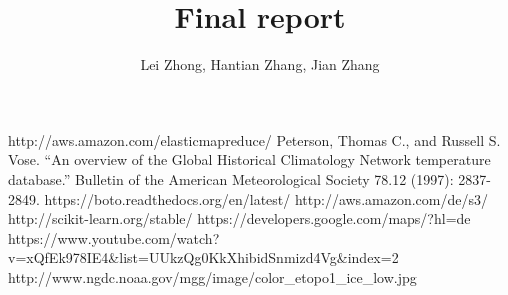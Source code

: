 \documentclass[a4paper]{article}
\begin{document}
\newtheorem{thm}{Theorem}
\newtheorem*{thm*}{Theorem}
\newtheorem{lem}{Lemma}
\newtheorem{cla}{Claim}
\newtheorem{prop}{Proposition}

\title{Final report}

\author{Lei Zhong, Hantian Zhang, Jian Zhang}
\date{}
\maketitle







%
%
\begin{thebibliography}{1}
     http://aws.amazon.com/elasticmapreduce/
     Peterson, Thomas C., and Russell S. Vose. ``An overview of the Global Historical Climatology Network temperature database.'' Bulletin of the American Meteorological Society 78.12 (1997): 2837-2849.
     https://boto.readthedocs.org/en/latest/
     http://aws.amazon.com/de/s3/
     http://scikit-learn.org/stable/
     https://developers.google.com/maps/?hl=de
     https://www.youtube.com/watch?v=xQfEk978IE4\&list=UUkzQg0KkXhibidSnmizd4Vg\&index=2
     http://www.ngdc.noaa.gov/mgg/image/color\_etopo1\_ice\_low.jpg
\end{thebibliography}
\end{document}
